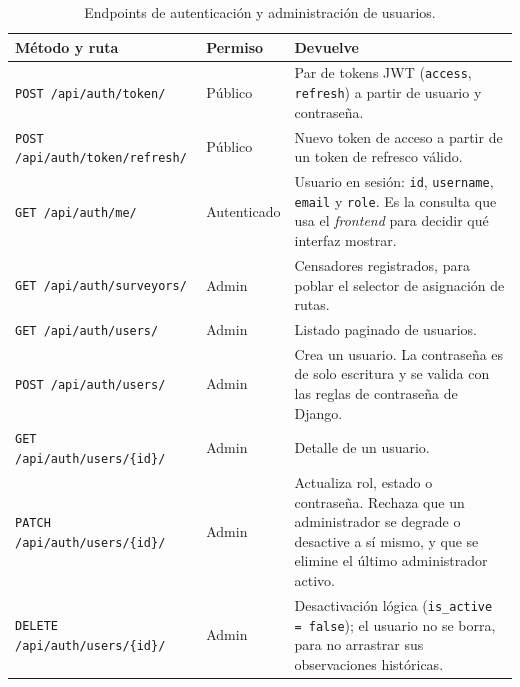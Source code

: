 \begin{table}[H]
  \centering
  \caption{Endpoints de autenticación y administración de usuarios.}
  \label{tab:anexo_api_auth}
  \small
  \begin{tabularx}{\textwidth}{@{}p{5.5cm} p{1.9cm} X@{}}
    \toprule
    Método y ruta & Permiso & Devuelve \\
    \midrule
    \texttt{POST \slash api\slash auth\slash token\slash }          & Público      & Par de tokens JWT (\texttt{access}, \texttt{refresh}) a partir de usuario y contraseña. \\
    \texttt{POST \slash api\slash auth\slash token\slash refresh\slash }  & Público      & Nuevo token de acceso a partir de un token de refresco válido. \\
    \texttt{GET \slash api\slash auth\slash me\slash }              & Autenticado  & Usuario en sesión: \texttt{id}, \texttt{username}, \texttt{email} y \texttt{role}. Es la consulta que usa el \textit{frontend} para decidir qué interfaz mostrar. \\
    \texttt{GET \slash api\slash auth\slash surveyors\slash }       & Admin        & Censadores registrados, para poblar el selector de asignación de rutas. \\
    \texttt{GET \slash api\slash auth\slash users\slash }           & Admin        & Listado paginado de usuarios. \\
    \texttt{POST \slash api\slash auth\slash users\slash }          & Admin        & Crea un usuario. La contraseña es de solo escritura y se valida con las reglas de contraseña de Django. \\
    \texttt{GET \slash api\slash auth\slash users\slash \{id\}\slash }    & Admin        & Detalle de un usuario. \\
    \texttt{PATCH \slash api\slash auth\slash users\slash \{id\}\slash }  & Admin        & Actualiza rol, estado o contraseña. Rechaza que un administrador se degrade o desactive a sí mismo, y que se elimine el último administrador activo. \\
    \texttt{DELETE \slash api\slash auth\slash users\slash \{id\}\slash } & Admin        & Desactivación lógica (\texttt{is\_active = false}); el usuario no se borra, para no arrastrar sus observaciones históricas. \\
    \bottomrule
  \end{tabularx}
\end{table}

